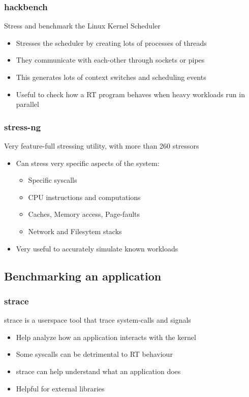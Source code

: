 \begin{frame}
        \frametitle{hackbench}
        Stress and benchmark the Linux Kernel Scheduler
        \begin{itemize}
                \item Stresses the scheduler by creating lots of processes of threads
                \item They communicate with each-other through sockets or pipes
                \item This generates lots of context switches and scheduling events
                \item Useful to check how a RT program behaves when heavy workloads run in parallel
        \end{itemize}
\end{frame}

\begin{frame}
        \frametitle{stress-ng}
        Very feature-full stressing utility, with more than 260 stressors
        \begin{itemize}
                \item Can stress very specific aspects of the system:
                        \begin{itemize}
                                \item Specific syscalls
                                \item CPU instructions and computations
                                \item Caches, Memory access, Page-faults
                                \item Network and Filesytem stacks
                        \end{itemize}
                \item Very useful to accurately simulate known workloads
        \end{itemize}
\end{frame}

\subsection{Benchmarking an application}
\begin{frame}
        \frametitle{strace}
        strace is a userspace tool that trace system-calls and signals
        \begin{itemize}
                \item Help analyze how an application interacts with the kernel
                \item Some syscalls can be detrimental to RT behaviour
                \item strace can help understand what an application does
                \item Helpful for external libraries
        \end{itemize}
\end{frame}

